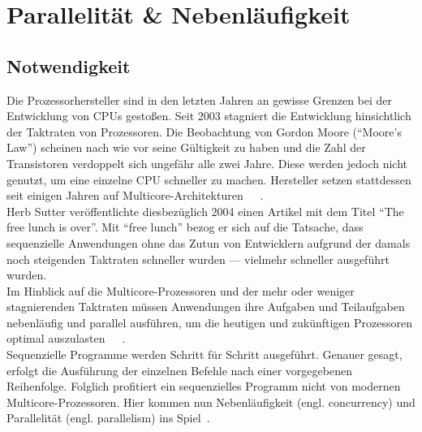 \pagebreak

\section{Parallelität \& Nebenläufigkeit}

\subsection{Notwendigkeit}\label{subsec:notwendigkeit}
Die Prozessorhersteller sind in den letzten Jahren an gewisse Grenzen bei der Entwicklung von CPUs gestoßen. Seit 2003 stagniert die Entwicklung hinsichtlich der Taktraten von Prozessoren. Die Beobachtung von Gordon Moore (\enquote{Moore's Law}) scheinen nach wie vor seine Gültigkeit zu haben und die Zahl der Transistoren verdoppelt sich ungefähr alle zwei Jahre. Diese werden jedoch nicht genutzt, um eine einzelne CPU schneller zu machen. Hersteller setzen stattdessen seit einigen Jahren auf Multicore-Architekturen~\cite[S.~1]{butcher_seven_2014}~\cite[S.~108]{vernon_reactive_2016}~\cite{sutter_free_2004}.\\
Herb Sutter veröffentlichte diesbezüglich 2004 einen Artikel mit dem Titel \enquote{The free lunch is over}. Mit \enquote{free lunch} bezog er sich auf die Tatsache, dass sequenzielle Anwendungen ohne das Zutun von Entwicklern aufgrund der damals noch steigenden Taktraten schneller wurden --- vielmehr schneller ausgeführt wurden.\\
Im Hinblick auf die Multicore-Prozessoren und der mehr oder weniger stagnierenden Taktraten müssen Anwendungen ihre Aufgaben und Teilaufgaben nebenläufig und parallel ausführen, um die heutigen und zukünftigen Prozessoren optimal auszulasten~\cite[S.~45]{kuhn_reactive_2015}~\cite{sutter_free_2004}~\cite[S.~1]{butcher_seven_2014}.\\
Sequenzielle Programme werden Schritt für Schritt ausgeführt. Genauer gesagt, erfolgt die Ausführung der einzelnen Befehle nach einer vorgegebenen Reihenfolge. Folglich profitiert ein sequenzielles Programm nicht von modernen Multicore-Prozessoren. Hier kommen nun Nebenläufigkeit (engl. concurrency) und Parallelität (engl. parallelism) ins Spiel~\cite[S.~3]{butcher_seven_2014}.\\

